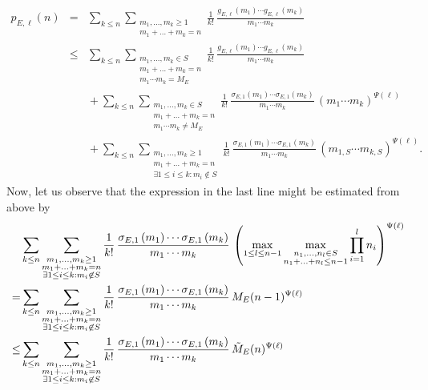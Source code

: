 \documentclass[12pt]{amsart}
\theoremstyle{definition}
\theoremstyle{remark}
\numberwithin{theorem}{section} \numberwithin{equation}{section}
\begin{document}
\begin{eqnarray*}
p_{E,\ell }(n) & =  & 
\sum _{k\leq n}\sum _{\substack{m_{1},\ldots ,m_{k} \geq 1 \\ m_{1}+\ldots +m_{k}=n}}
\frac{1}{k!} \, \frac{g_{E,\ell }\left( m_{1}\right) 
\cdots g_{E,\ell }\left( m_{k}\right) }{m_{1}\cdots m_{k}}\\
&\leq &
\sum _{k\leq n}\sum _{\substack{ m_1,\ldots,m_k\in S \\ m_{1}+\ldots +m_{k}=n  \\ m_1\cdots m_k=M_E}}
\frac{1}{k!} \, 
\frac{g_{E,\ell }\left( m_{1}\right) 
\cdots g_{E,\ell }\left( m_{k}\right) }{m_{1}\cdots m_{k}}\\
&
&{}+
\sum _{k\leq n}\sum _{\substack{m_1,\ldots,m_k\in S \\ m_{1}+\ldots +m_{k}=n \\ m_1\cdots m_k\not=M_E}}
\frac{1}{k!} \, 
\frac{\sigma_{E,1}\left( m_{1}\right) 
\cdots \sigma_{E,1}\left( m_{k}\right) }{m_{1}\cdots m_{k}}
\, \left(m_1 \cdots m_k\right)^{\Psi(\ell)}\\
&
&{}+
\sum _{k\leq n}\sum _{\substack{m_{1},\ldots ,m_{k} \geq 1 \\ m_{1}+\ldots +m_{k}=n \\ \exists 1\leq i\leq k: m_i\not\in S}}
\frac{1}{k!} \, 
\frac{\sigma_{E,1}\left( m_{1}\right) 
\cdots \sigma_{E,1}\left( m_{k}\right) }{m_1 \cdots m_k}
\, \left(m_{1,S} \cdots m_{k,S}\right)^{\Psi(\ell)}.
\end{eqnarray*}
Now, let us observe that the expression in the last line might be estimated from above by
\begin{align*}
&\sum _{k\leq n}\sum _{\substack{m_{1},\ldots ,m_{k} \geq 1 \\ m_{1}+\ldots +m_{k}=n \\ \exists 1\leq i\leq k: m_i\not\in S}}
\frac{1}{k!} \, 
\frac{\sigma_{E,1}\left( m_{1}\right) 
\cdots \sigma_{E,1}\left( m_{k}\right) }{m_1 \cdots m_k}
\, \left(\max_{1\leq l\leq n-1}\max_{\substack{ n_1,\ldots,n_l\in S \\ n_{1}+\ldots +n_{l}\leq n-1}}\prod_{i=1}^ln_i\right)^{\Psi(\ell)}\\
= &\sum _{k\leq n}\sum _{\substack{m_{1},\ldots ,m_{k} \geq 1 \\ m_{1}+\ldots +m_{k}=n \\ \exists 1\leq i\leq k: m_i\not\in S}}
\frac{1}{k!} \, 
\frac{\sigma_{E,1}\left( m_{1}\right) 
\cdots \sigma_{E,1}\left( m_{k}\right) }{m_1 \cdots m_k}
\, M_E(n-1)^{\Psi(\ell)}\\
\leq &\sum _{k\leq n}\sum _{\substack{m_{1},\ldots ,m_{k} \geq 1 \\ m_{1}+\ldots +m_{k}=n \\ \exists 1\leq i\leq k: m_i\not\in S}}
\frac{1}{k!} \, 
\frac{\sigma_{E,1}\left( m_{1}\right) 
\cdots \sigma_{E,1}\left( m_{k}\right) }{m_1 \cdots m_k}
\, \Tilde{M}_E(n)^{\Psi(\ell)}
\end{align*}
\end{document}
